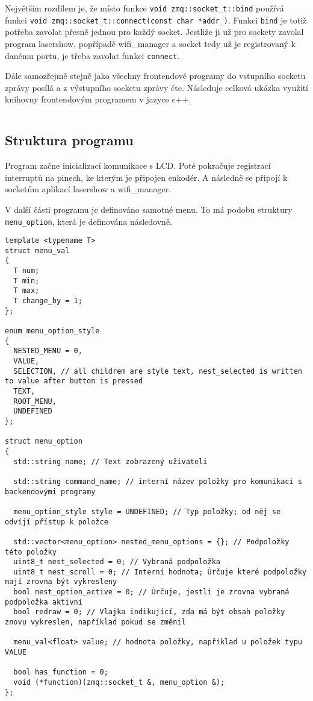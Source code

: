 Největším rozdílem je, že místo funkce \texttt{void zmq::socket_t::bind} používá funkci \texttt{void zmq::socket_t::connect(const char *addr_)}.
Funkci \texttt{bind} je totiž potřeba zavolat přesně jednou pro každý socket.
Jestliže ji už pro sockety zavolal program lasershow, popřípadě wifi\_manager a socket tedy už je registrovaný k danému portu, je třeba zavolat funkci \texttt{connect}.

Dále samozřejmě stejně jako všechny frontendové programy do vstupního socketu zprávy posílá a z výstupního socketu zprávy čte. Následuje celková ukázka využití knihovny frontendovým programem v jazyce c++.

\inputminted[frame=lines,fontsize=\footnotesize{}, linenos, breaklines]{cpp}{code_examples/zmq_client.cpp}

\subsection{Struktura programu}
Program začne inicializací komunikace s LCD.
Poté pokračuje registrací interruptů na pinech, ke kterým je připojen enkodér. A následně se připojí k socketům aplikací lasershow a wifi\_manager.

V další části programu je definováno samotné menu. To má podobu struktury \texttt{menu_option}, která je definována následovně.

\begin{verbatim}
template <typename T>
struct menu_val
{
  T num;
  T min;
  T max;
  T change_by = 1;
};

enum menu_option_style
{
  NESTED_MENU = 0,
  VALUE,
  SELECTION, // all childrem are style text, nest_selected is written to value after button is pressed
  TEXT,
  ROOT_MENU,
  UNDEFINED
};

struct menu_option
{
  std::string name; // Text zobrazený uživateli

  std::string command_name; // interní název položky pro komunikaci s backendovými programy

  menu_option_style style = UNDEFINED; // Typ položky; od něj se odvíjí přístup k položce

  std::vector<menu_option> nested_menu_options = {}; // Podpoložky této položky
  uint8_t nest_selected = 0; // Vybraná podpoložka
  uint8_t nest_scroll = 0; // Interní hodnota; Úrčuje které podpoložky mají zrovna být vykresleny
  bool nest_option_active = 0; // Úrčuje, jestli je zrovna vybraná podpoložka aktivní
  bool redraw = 0; // Vlajka indikující, zda má být obsah položky znovu vykreslen, například pokud se změnil

  menu_val<float> value; // hodnota položky, například u položek typu VALUE

  bool has_function = 0;
  void (*function)(zmq::socket_t &, menu_option &);
};
\end{verbatim}

